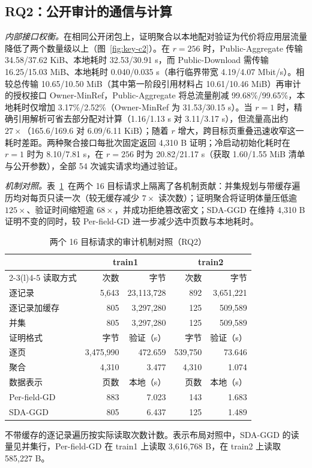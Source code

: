 \documentclass[10pt,journal]{IEEEtran}
\newcommand{\tabnote}[1]{\par\smallskip\parbox{\linewidth}{\footnotesize #1}}
\begin{document}
\subsection{RQ2：公开审计的通信与计算}
\emph{内部接口权衡。}在相同公开闭包上，证明聚合以本地配对验证为代价将应用层流量降低了两个数量级以上（图~\ref{fig:key-c2}）。在 $r{=}256$ 时，Public-Aggregate 传输 34.58/37.62 KiB、本地耗时 32.53/30.91 s，而 Public-Download 需传输 16.25/15.03 MiB、本地耗时 0.040/0.035 s（串行临界带宽 4.19/4.07 Mbit/s）。相较总传输 10.65/10.50 MiB（其中第一阶段引用材料占 10.61/10.46 MiB）再审计的授权接口 Owner-MinRef，Public-Aggregate 将总流量削减 99.68\%/99.65\%，本地耗时仅增加 3.17\%/2.52\%（Owner-MinRef 为 31.53/30.15 s）。当 $r{=}1$ 时，精确引用解析可省去部分配对计算（1.16/1.13 s 对 3.11/3.17 s），但流量高出约 $27\times$（165.6/169.6 对 6.09/6.11 KiB）；随着 $r$ 增大，跨目标页重叠迅速收窄这一耗时差距。两种聚合接口每批次固定返回 4,310 B 证明；冷启动初始化耗时在 $r{=}1$ 时为 8.10/7.81 s，在 $r{=}256$ 时为 20.82/21.17 s（获取 1.60/1.55 MiB 清单与公开参数），全部 54 次诚实请求均通过验证。

\emph{机制对照。}表~\ref{tab:c2-mechanisms}~在两个 16 目标请求上隔离了各机制贡献：并集规划与带缓存遍历均对每页只读一次（较无缓存减少 $7\times$ 读次数）；证明聚合将证明体量压低逾 $125\times$、验证时间缩短逾 $68\times$，并成功拒绝篡改密文；SDA-GGD 在维持 4,310 B 证明不变的同时，较 Per-field-GD 进一步减少选中页数与本地耗时。

\begin{table}[t]\centering\small
\caption{两个 16 目标请求的审计机制对照（RQ2）}
\label{tab:c2-mechanisms}
\setlength{\tabcolsep}{3.2pt}
\begin{tabular}{@{}lrrrr@{}}\toprule
 & \multicolumn{2}{c}{train1} & \multicolumn{2}{c}{train2}\\
\cmidrule(lr){2-3}\cmidrule(l){4-5}
读取方式 & 次数 & 字节 & 次数 & 字节\\\midrule
逐记录 & 5,643 & 23,113,728 & 892 & 3,651,221\\
逐记录加缓存 & 805 & 3,297,280 & 125 & 509,589\\
并集 & 805 & 3,297,280 & 125 & 509,589\\\midrule
证明格式 & 字节 & 验证（s） & 字节 & 验证（s）\\\midrule
逐页 & 3,475,990 & 472.659 & 539,750 & 73.646\\
聚合 & 4,310 & 3.477 & 4,310 & 1.074\\\midrule
数据表示 & 页数 & 本地（s） & 页数 & 本地（s）\\\midrule
Per-field-GD & 883 & 7.023 & 143 & 1.683\\
SDA-GGD & 805 & 6.437 & 125 & 1.489\\\bottomrule
\end{tabular}
\tabnote{不带缓存的逐记录遍历按实际读取次数计数。表示布局对照中，SDA-GGD 的读量见并集行，Per-field-GD 在 train1 上读取 3,616,768 B，在 train2 上读取 585,227 B。}
\end{table}
\end{document}
